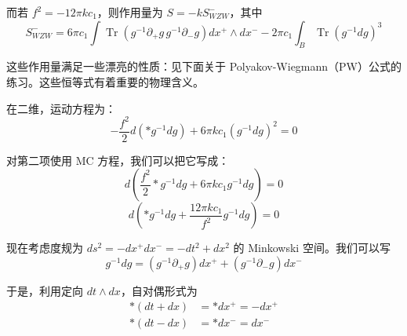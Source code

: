 而若 $f^2=-12\pi k c_1$，则作用量为 $S=-kS^-_{WZW}$，其中
\begin{equation}
  S^-_{WZW} = 6\pi c_1\int\operatorname{Tr}\left(g^{-1}\partial_+ g\,g^{-1}\partial_- g\right)dx^+\wedge dx^- - 2\pi c_1\int_B\operatorname{Tr}\left(g^{-1}dg\right)^3
  \tag{4.33}
  \label{eq:4.33}
\end{equation}

这些作用量满足一些漂亮的性质：见下面关于 Polyakov-Wiegmann（PW）公式的练习。这些恒等式有着重要的物理含义。

在二维，运动方程为：
\begin{equation}
  -\frac{f^2}{2}d\left(\ast g^{-1}dg\right) + 6\pi k c_1\left(g^{-1}dg\right)^2 = 0
  \tag{4.34}
  \label{eq:4.34}
\end{equation}

对第二项使用 MC 方程，我们可以把它写成：
\begin{equation}
  d\left(\frac{f^2}{2}\ast g^{-1}dg + 6\pi k c_1 g^{-1}dg\right) = 0
  \tag{4.35}
  \label{eq:4.35}
\end{equation}
\begin{equation}
  d\left(\ast g^{-1}dg + \frac{12\pi k c_1}{f^2}g^{-1}dg\right) = 0
  \tag{4.36}
  \label{eq:4.36}
\end{equation}

现在考虑度规为 $ds^2=-dx^+dx^-=-dt^2+dx^2$ 的 Minkowski 空间。我们可以写
\begin{equation}
  g^{-1}dg = \left(g^{-1}\partial_+ g\right)dx^+ + \left(g^{-1}\partial_- g\right)dx^-
  \tag{4.37}
  \label{eq:4.37}
\end{equation}

于是，利用定向 $dt\wedge dx$，自对偶形式为
\begin{equation}
  \begin{aligned}
    \ast(dt+dx) &= \ast dx^+ = -dx^+\\
    \ast(dt-dx) &= \ast dx^- = dx^-
  \end{aligned}
  \tag{4.38}
  \label{eq:4.38}
\end{equation}

